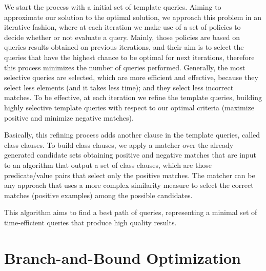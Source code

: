 \begin{itemize}
We start the process with a initial set of template queries. Aiming to approximate our solution to the optimal solution, we approach this problem in an iterative fashion, where at each iteration we make use of a set of policies to decide whether or not evaluate a query. Mainly, those policies are based on queries results obtained on previous iterations, and their aim is to select the queries that have the highest chance to be optimal for next iterations, therefore this process minimizes the number of queries performed. Generally, the most selective queries are selected, which are more efficient and effective, because they select less elements (and it takes less time); and they select less incorrect matches. To be effective, at each iteration we refine the template queries, building highly selective template queries with respect to our optimal criteria (maximize positive and minimize negative matches). 

Basically, this refining process adds another clause in the template queries, called class clauses. To build class clauses, we apply a matcher over the already generated candidate sets obtaining positive and negative matches that are input to an algorithm that output a set of class clauses, which are those predicate/value pairs that select only the positive matches.  The matcher can be any approach that uses a more complex similarity measure to select the correct matches (positive examples) among the possible candidates. 

This algorithm aims to find a best path of queries, representing a minimal set of time-efficient queries that produce high quality results.


\end{itemize}



\section{Branch-and-Bound Optimization}

